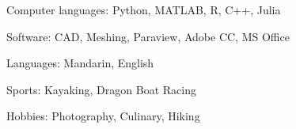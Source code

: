 

\vspace{10pt}
\begin{cvitems}
\paragraphstyle
\item Computer languages: Python, MATLAB, R, C++, Julia
\item Software: CAD, Meshing, Paraview, Adobe CC, MS Office
\item Languages: Mandarin, English
\end{cvitems}
\vspace{10pt}
\vspace{10pt}
\begin{cvitems}
\paragraphstyle
\item Sports: Kayaking, Dragon Boat Racing
\item Hobbies: Photography, Culinary, Hiking
\end{cvitems}


